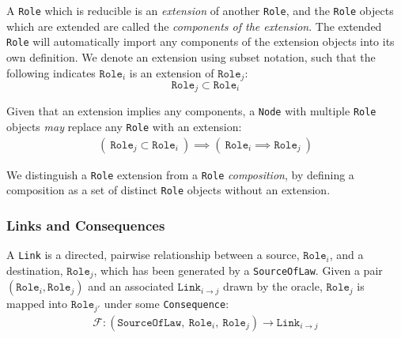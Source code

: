 \documentclass{article}
\numberwithin{equation}{section}
\begin{document}
A \texttt{Role} which is reducible is an \textit{extension} of another \texttt{Role}, and the \texttt{Role} objects which are extended are called the \textit{components of the extension}. The extended \texttt{Role} will automatically import any components of the extension objects into its own definition. We denote an extension using subset notation, such that the following indicates $\texttt{Role}_i$ is an extension of $\texttt{Role}_j$: 
\begin{equation}
\texttt{Role}_j \subset \texttt{Role}_i
\end{equation}

Given that an extension implies any components, a \texttt{Node} with multiple \texttt{Role} objects \textit{may} replace any \texttt{Role} with an extension:
\begin{align}
( \ \texttt{Role}_j \subset \texttt{Role}_i \ ) \implies ( \ \texttt{Role}_i \implies \texttt{Role}_j \ )
\end{align}

We distinguish a \texttt{Role} extension from a \texttt{Role} \textit{composition}, by defining a composition as a set of distinct \texttt{Role} objects without an extension. %



\subsubsection{Links and Consequences}\label{section:links-and-consequences}

A \texttt{Link} is a directed, pairwise relationship between a source, $\texttt{Role}_i$, and a destination, $\texttt{Role}_j$, which has been generated by a \texttt{SourceOfLaw}. Given a pair $(\texttt{Role}_i, \texttt{Role}_j)$ and an associated $\texttt{Link}_{i \rightarrow j}$ drawn by the oracle, $\texttt{Role}_j$ is mapped into $\texttt{Role}_{j'}$ under some \texttt{Consequence}:
\begin{align}\label{eq:role-extension}
	\mathcal{F} : (\texttt{SourceOfLaw}, \ \texttt{Role}_i, \ \texttt{Role}_j) \rightarrow  \texttt{Link}_{i \rightarrow j}
\end{align}
\end{document}
